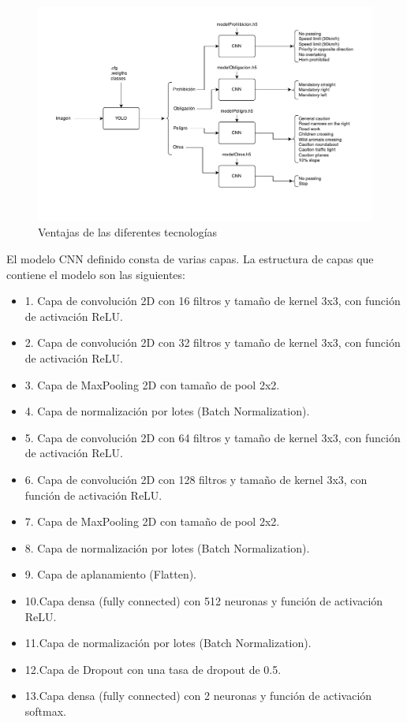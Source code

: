 \begin{figure}[H]
    \centering
 	\includegraphics[width=\textwidth]{Imagenes/IA/EsquemaIA.pdf}
    \caption{Ventajas de las diferentes tecnologías}
    \label{esquema}
\end{figure}

El modelo CNN definido consta de varias capas. La estructura de capas que contiene el modelo son las siguientes:\\

\begin{itemize}
\item 1.	Capa de convolución 2D con 16 filtros y tamaño de kernel 3x3, con función de activación ReLU.
\item 2.	Capa de convolución 2D con 32 filtros y tamaño de kernel 3x3, con función de activación ReLU.
\item 3.	Capa de MaxPooling 2D con tamaño de pool 2x2.
\item 4.	Capa de normalización por lotes (Batch Normalization).
\item 5.	Capa de convolución 2D con 64 filtros y tamaño de kernel 3x3, con función de activación ReLU.
\item 6.	Capa de convolución 2D con 128 filtros y tamaño de kernel 3x3, con función de activación ReLU.
\item 7.	Capa de MaxPooling 2D con tamaño de pool 2x2.
\item 8.	Capa de normalización por lotes (Batch Normalization).
\item 9.	Capa de aplanamiento (Flatten).
\item 10.Capa densa (fully connected) con 512 neuronas y función de activación ReLU.
\item 11.Capa de normalización por lotes (Batch Normalization).
\item 12.Capa de Dropout con una tasa de dropout de 0.5.
\item 13.Capa densa (fully connected) con 2 neuronas y función de activación softmax.
\end{itemize}


